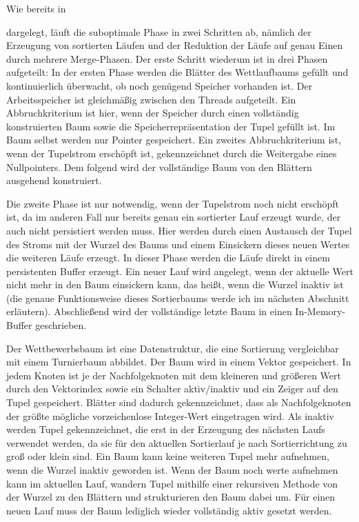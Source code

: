 \documentclass[a4paper,12pt,twoside]{article}
\begin{document}
Wie bereits in \author{Entwicklung} dargelegt, läuft die suboptimale Phase in zwei Schritten ab, nämlich der Erzeugung von sortierten Läufen und der Reduktion der Läufe auf genau Einen durch mehrere Merge-Phasen. Der erste Schritt wiederum ist in drei Phasen aufgeteilt: In der ersten Phase werden die Blätter des Wettlaufbaums gefüllt und kontinuierlich überwacht, ob noch genügend Speicher vorhanden ist. Der Arbeitsspeicher ist gleichmäßig zwischen den Threads aufgeteilt. Ein Abbruchkriterium ist hier, wenn der Speicher durch einen vollständig konstruierten Baum sowie die Speicherrepräsentation der Tupel gefüllt ist. Im Baum selbst werden nur Pointer gespeichert. Ein zweites Abbruchkriterium ist, wenn der Tupelstrom erschöpft ist, gekennzeichnet durch die Weitergabe eines Nullpointers. Dem folgend wird der vollständige Baum von den Blättern ausgehend konstruiert.

Die zweite Phase ist nur notwendig, wenn der Tupelstrom noch nicht erschöpft ist, da im anderen Fall nur bereits genau ein sortierter Lauf erzeugt wurde, der auch nicht persistiert werden muss. Hier werden durch einen Austausch der Tupel des Stroms mit der Wurzel des Baums und einem Einsickern dieses neuen Wertes die weiteren Läufe erzeugt. In dieser Phase werden die Läufe direkt in einem persistenten Buffer erzeugt. Ein neuer Lauf wird angelegt, wenn der aktuelle Wert nicht mehr in den Baum einsickern kann, das heißt, wenn die Wurzel inaktiv ist (die genaue Funktionsweise dieses Sortierbaums werde ich im nächsten Abschnitt erläutern). Abschließend wird der vollständige letzte Baum in einen In-Memory-Buffer geschrieben.

Der Wettbewerbsbaum ist eine Datenstruktur, die eine Sortierung vergleichbar mit einem Turnierbaum abbildet. Der Baum wird in einem Vektor gespeichert. In jedem Knoten ist je der Nachfolgeknoten mit dem kleineren und größeren Wert durch den Vektorindex sowie ein Schalter aktiv/inaktiv und ein Zeiger auf den Tupel gespeichert. Blätter sind dadurch gekennzeichnet, dass als Nachfolgeknoten der größte mögliche vorzeichenlose Integer-Wert eingetragen wird. Als inaktiv werden Tupel gekennzeichnet, die erst in der Erzeugung des nächsten Laufs verwendet werden, da sie für den aktuellen Sortierlauf je nach Sortierrichtung zu groß oder klein sind. Ein Baum kann keine weiteren Tupel mehr aufnehmen, wenn die Wurzel inaktiv geworden ist. Wenn der Baum noch werte aufnehmen kann im aktuellen Lauf, wandern Tupel mithilfe einer rekursiven Methode von der Wurzel zu den Blättern und strukturieren den Baum dabei um. Für einen neuen Lauf muss der Baum lediglich wieder vollständig aktiv gesetzt werden. 
\end{document}
